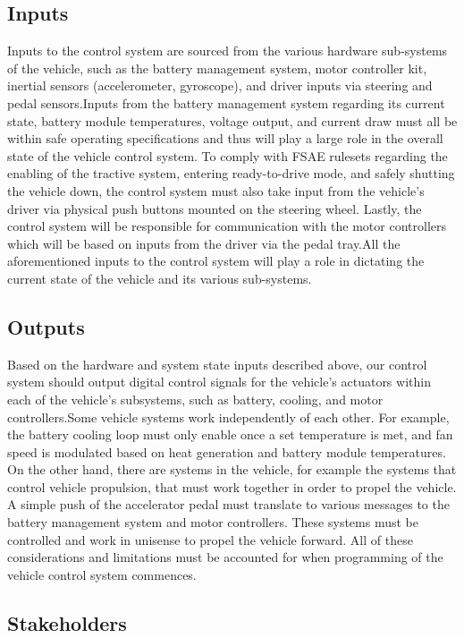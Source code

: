 \documentclass{article}
\begin{document}
\subsection{Inputs}
Inputs to the control system are sourced from the various hardware sub-systems 
of the vehicle, such as the battery management system, motor controller kit, 
inertial sensors (accelerometer, gyroscope), and driver inputs via steering 
and pedal sensors.Inputs from the battery management system regarding its 
current state, battery module temperatures, voltage output, and current draw 
must all be within safe operating specifications and thus will play a large 
role in the overall state of the vehicle control system. 
To comply with FSAE rulesets regarding the enabling of the tractive system, 
entering ready-to-drive mode, and safely shutting the vehicle down, the control 
system must also take input from the vehicle’s driver via physical push buttons 
mounted on the steering wheel. Lastly, the control system will be responsible 
for communication with the motor controllers which will be based on inputs from 
the driver via the pedal tray.All the aforementioned inputs to the control system 
will play a role in dictating the current state of the vehicle and its various 
sub-systems.

\subsection{Outputs}
Based on the hardware and system state inputs described above, our control system 
should output digital control signals for the vehicle’s actuators within each of 
the vehicle’s subsystems, such as battery, cooling, and motor controllers.Some 
vehicle systems work independently of each other. For example, the battery cooling 
loop must only enable once a set temperature is met, and fan speed is modulated 
based on heat generation and battery module temperatures. On the other hand, there 
are systems in the vehicle, for example the systems that control vehicle propulsion, 
that must work together in order to propel the vehicle. A simple push of the 
accelerator pedal must translate to various messages to the battery management system 
and motor controllers. These systems must be controlled and work in unisense to 
propel the vehicle forward. All of these considerations and limitations must be 
accounted for when programming of the vehicle control system commences.

\subsection{Stakeholders}
\end{document}
